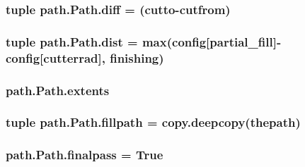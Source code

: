 \subsubsection[{diff}]{\setlength{\rightskip}{0pt plus 5cm}tuple path.\+Path.\+diff = ({\bf cutto}-\/{\bf cutfrom})\hspace{0.3cm}{\ttfamily [static]}}\label{classpath_1_1_path_ac10e339216b461a2eaa85065dda321f1}
\hypertarget{classpath_1_1_path_afec2f41c3bc8ffadb200eaf30e780ea5}{}
\subsubsection[{dist}]{\setlength{\rightskip}{0pt plus 5cm}tuple path.\+Path.\+dist = max({\bf config}\mbox{[}\textquotesingle{}partial\+\_\+fill\textquotesingle{}\mbox{]}-\/{\bf config}\mbox{[}\textquotesingle{}cutterrad\textquotesingle{}\mbox{]}, {\bf finishing})\hspace{0.3cm}{\ttfamily [static]}}\label{classpath_1_1_path_afec2f41c3bc8ffadb200eaf30e780ea5}
\hypertarget{classpath_1_1_path_aebbcc8a89fc649f3afa2b18c71186fef}{}
\subsubsection[{extents}]{\setlength{\rightskip}{0pt plus 5cm}path.\+Path.\+extents}\label{classpath_1_1_path_aebbcc8a89fc649f3afa2b18c71186fef}
\hypertarget{classpath_1_1_path_ae925ef71c080bd87e3599b6d4f9944fc}{}
\subsubsection[{fillpath}]{\setlength{\rightskip}{0pt plus 5cm}tuple path.\+Path.\+fillpath = copy.\+deepcopy({\bf thepath})\hspace{0.3cm}{\ttfamily [static]}}\label{classpath_1_1_path_ae925ef71c080bd87e3599b6d4f9944fc}
\hypertarget{classpath_1_1_path_ad8b573890c87e26baed6baaca4d6510d}{}
\subsubsection[{finalpass}]{\setlength{\rightskip}{0pt plus 5cm}path.\+Path.\+finalpass = True\hspace{0.3cm}{\ttfamily [static]}}\label{classpath_1_1_path_ad8b573890c87e26baed6baaca4d6510d}
\hypertarget{classpath_1_1_path_a90d350ebcf02a6abf6f2b8d373707158}{}
